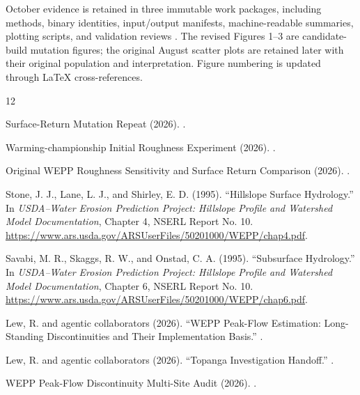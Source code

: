 \documentclass[11pt]{article}
\begin{document}
October evidence is retained in three immutable work packages, including
methods, binary identities, input/output manifests, machine-readable summaries,
plotting scripts, and validation reviews \cite{mutationredo,rrfixed,rrlegacy}.
The revised Figures 1--3 are candidate-build mutation figures; the original
August scatter plots are retained later with their original population and
interpretation. Figure numbering is updated through LaTeX cross-references.

\begingroup
\small\raggedright
\begin{thebibliography}{12}

Surface-Return Mutation Repeat (2026).
.

Warming-championship Initial Roughness Experiment (2026).
.

Original WEPP Roughness Sensitivity and Surface Return Comparison (2026).
.

Stone, J. J., Lane, L. J., and Shirley, E. D. (1995).
``Hillslope Surface Hydrology.'' In \emph{USDA--Water Erosion Prediction
Project: Hillslope Profile and Watershed Model Documentation}, Chapter 4,
NSERL Report No. 10.
\url{https://www.ars.usda.gov/ARSUserFiles/50201000/WEPP/chap4.pdf}.

Savabi, M. R., Skaggs, R. W., and Onstad, C. A. (1995).
``Subsurface Hydrology.'' In \emph{USDA--Water Erosion Prediction Project:
Hillslope Profile and Watershed Model Documentation}, Chapter 6,
NSERL Report No. 10.
\url{https://www.ars.usda.gov/ARSUserFiles/50201000/WEPP/chap6.pdf}.

Lew, R. and agentic collaborators (2026).
``WEPP Peak-Flow Estimation: Long-Standing Discontinuities and Their
Implementation Basis.''
.

Lew, R. and agentic collaborators (2026).
``Topanga Investigation Handoff.''
.

WEPP Peak-Flow Discontinuity Multi-Site Audit (2026).
.


\end{thebibliography}
\end{document}
